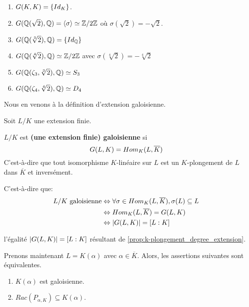 \begin{exemple} [Exercice]
	\begin{enumerate}
		\item $G(K, K) = \left\{ Id_{K} \right\}$.
		\item $G(\mathbb{Q}(\sqrt{2}), \mathbb{Q}) =
			\left<\sigma\right> \simeq
			\mathbb{Z}/2\mathbb{Z}$ où $\sigma(\sqrt{2}) = - \sqrt{2}$.
		\item $G(\mathbb{Q}(\sqrt[3]{2}), \mathbb{Q}) =
			\left\{ Id_{\mathbb{Q}} \right\}$
		\item $G(\mathbb{Q}(\sqrt[4]{2}), \mathbb{Q}) \simeq
			\mathbb{Z}/2\mathbb{Z}$ avec $\sigma(\sqrt[4]{2}) = - \sqrt[4]{2}$
		\item $G(\mathbb{Q}(\zeta_{3}, \sqrt[3]{2}), \mathbb{Q})
			\simeq S_{3}$
		\item $G(\mathbb{Q}(\zeta_{4}, \sqrt[4]{2}), \mathbb{Q})
			\simeq D_{4}$
	\end{enumerate}
\end{exemple}

Nous en venons à la définition d'extension galoisienne.

\begin{definition} 
	Soit $L/K$ une extension finie.

	$L/K$ est \textbf{(une extension finie) galoisienne} si
	\begin{equation}
		G(L, K) = Hom_{K}(L, \overline{K})
	\end{equation}
	C'est-à-dire que tout isomorphisme $K$-linéaire sur $L$
	est un $K$-plongement de $L$ dans $\overline{K}$ et inversément.
\end{definition}

C'est-à-dire que:
\begin{align}
	L/K \text{ galoisienne}
	& \Leftrightarrow \forall \sigma \in Hom_{K}(L, \overline{K}), \sigma(L) \subseteq L \\
	& \Leftrightarrow Hom_{K}(L, \overline{K}) = G(L, K) \\
	& \Leftrightarrow |G(L, K)| = [L : K]
\end{align}

l'égalité $|G(L, K)| = [L : K]$ résultant
de \ref{prop:k-plongement_degree_extension}.

\begin{proposition}
	Prenons maintenant $L = K(\alpha)$ avec $\alpha \in \overline{K}$. Alors,
	les assertions suivantes sont équivalentes.

	\begin{enumerate}
		\item $K(\alpha)$ est galoisienne.
		\item $Rac(P_{\alpha, K}) \subseteq K(\alpha)$.
	\end{enumerate}
\end{proposition}

